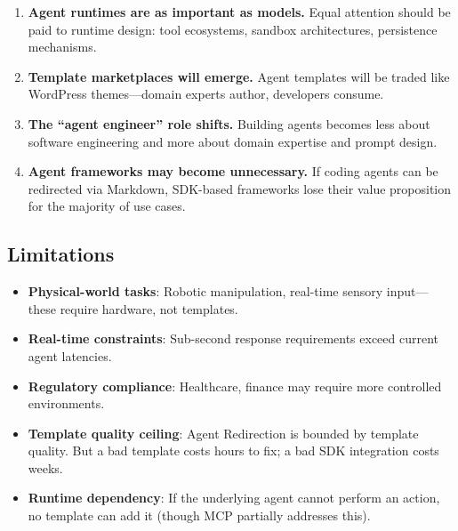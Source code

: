 \begin{enumerate}[nosep]
\item \textbf{Agent runtimes are as important as models.} Equal attention should be paid to runtime design: tool ecosystems, sandbox architectures, persistence mechanisms.

\item \textbf{Template marketplaces will emerge.} Agent templates will be traded like WordPress themes---domain experts author, developers consume.

\item \textbf{The ``agent engineer'' role shifts.} Building agents becomes less about software engineering and more about domain expertise and prompt design.

\item \textbf{Agent frameworks may become unnecessary.} If coding agents can be redirected via Markdown, SDK-based frameworks lose their value proposition for the majority of use cases.
\end{enumerate}

\subsection{Limitations}

\begin{itemize}[nosep]
\item \textbf{Physical-world tasks}: Robotic manipulation, real-time sensory input---these require hardware, not templates.
\item \textbf{Real-time constraints}: Sub-second response requirements exceed current agent latencies.
\item \textbf{Regulatory compliance}: Healthcare, finance may require more controlled environments.
\item \textbf{Template quality ceiling}: Agent Redirection is bounded by template quality. But a bad template costs hours to fix; a bad SDK integration costs weeks.
\item \textbf{Runtime dependency}: If the underlying agent cannot perform an action, no template can add it (though MCP partially addresses this).
\end{itemize}
